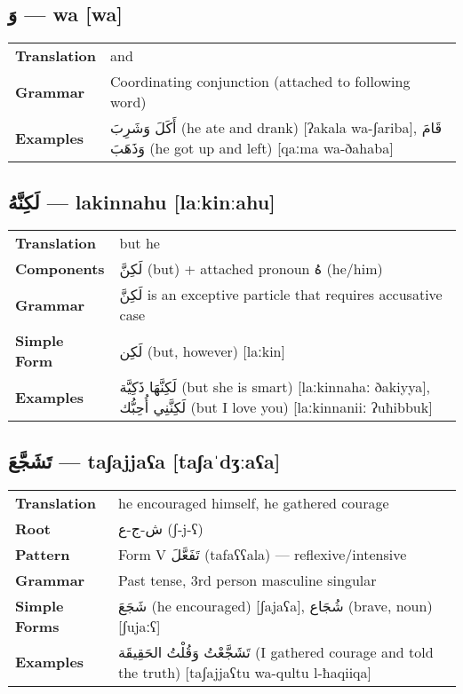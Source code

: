 \documentclass[a4paper,12pt]{article}
\begin{document}
\subsection{\textarabic{وَ} — \textbf{wa} [wa]}
\begin{tabular}{p{3cm}p{10cm}}
\toprule
\textbf{Translation} & and \\
\textbf{Grammar} & Coordinating conjunction (attached to following word) \\
\textbf{Examples} & \textarabic{أَكَلَ وَشَرِبَ} (he ate and drank) [ʔakala wa-ʃariba], \textarabic{قَامَ وَذَهَبَ} (he got up and left) [qaːma wa-ðahaba] \\
\bottomrule
\end{tabular}

\subsection{\textarabic{لَكِنَّهُ} — \textbf{lakinnahu} [laːkinːahu]}
\begin{tabular}{p{3cm}p{10cm}}
\toprule
\textbf{Translation} & but he \\
\textbf{Components} & \textarabic{لَكِنَّ} (but) + attached pronoun \textarabic{هُ} (he/him) \\
\textbf{Grammar} & \textarabic{لَكِنَّ} is an exceptive particle that requires accusative case \\
\textbf{Simple Form} & \textarabic{لَكِن} (but, however) [laːkin] \\
\textbf{Examples} & \textarabic{لَكِنَّهَا ذَكِيَّة} (but she is smart) [laːkinnahaː ðakiyya], \textarabic{لَكِنَّنِي أُحِبُّك} (but I love you) [laːkinnaniiː ʔuħibbuk] \\
\bottomrule
\end{tabular}

\subsection{\textarabic{تَشَجَّعَ} — \textbf{taʃajjaʕa} [taʃaˈdʒːaʕa]}
\begin{tabular}{p{3cm}p{10cm}}
\toprule
\textbf{Translation} & he encouraged himself, he gathered courage \\
\textbf{Root} & \textarabic{ش-ج-ع} (ʃ-j-ʕ) \\
\textbf{Pattern} & Form V \textarabic{تَفَعَّلَ} (tafaʕʕala) — reflexive/intensive \\
\textbf{Grammar} & Past tense, 3rd person masculine singular \\
\textbf{Simple Forms} & \textarabic{شَجَعَ} (he encouraged) [ʃajaʕa], \textarabic{شُجَاع} (brave, noun) [ʃujaːʕ] \\
\textbf{Examples} & \textarabic{تَشَجَّعْتُ وَقُلْتُ الحَقِيقَة} (I gathered courage and told the truth) [taʃajjaʕtu wa-qultu l-ħaqiiqa] \\
\bottomrule
\end{tabular}
\end{document}
